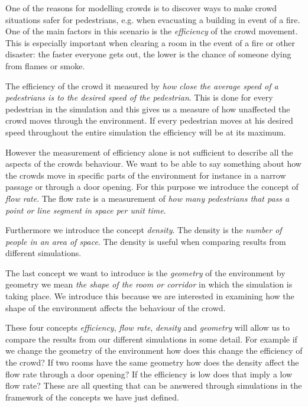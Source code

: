 One of the reasons for modelling crowds is to discover ways to make crowd 
situations safer for pedestrians, e.g. when evacuating a building in event of 
a fire. One of the main factors in this scenario is the \emph{efficiency} of 
the crowd movement. This is especially important when clearing a room in the 
event of a fire or other disaster: the faster everyone gets out, the lower is 
the chance of someone dying from flames or smoke.

The efficiency of the crowd it measured by \emph{how close the average speed 
of a pedestrians is to the desired speed of the pedestrian}. This is done for 
every pedestrian in the simulation and this gives us a measure of how unaffected the crowd moves through the environment. If every pedestrian moves at his desired speed throughout the entire simulation the efficiency will be at its maximum.

However the measurement of efficiency alone is not sufficient to describe all 
the aspects of the crowds behaviour. We want to be able to say something about 
how the crowds move in specific parts of the environment for instance in a 
narrow passage or through a door opening. For this purpose we introduce the 
concept of \emph{flow rate}. The flow rate is a measurement of \emph{how many pedestrians that pass a point or line segment in space per unit time}.

Furthermore we introduce the concept \emph{density}. The density is the \emph{number of people in an area of space}. The density is useful when comparing results from different simulations. 

The last concept we want to introduce is the \emph{geometry} of the environment by geometry we mean \emph{the shape of the room or corridor} in which the simulation is taking place. We introduce this because we are interested in examining how the shape of the environment affects the behaviour of the crowd.

These four concepts \emph{efficiency}, \emph{flow rate}, \emph{density} and 
\emph{geometry} will allow us to compare the results from our different simulations in some detail. For example if we change the geometry of the environment how does this change the efficiency of the crowd? If two rooms have the same geometry how does the density affect the flow rate through a door opening? If the efficiency is low does that imply a low flow rate? These are all questing that can be answered through simulations in the framework of the concepts we have just defined.    

